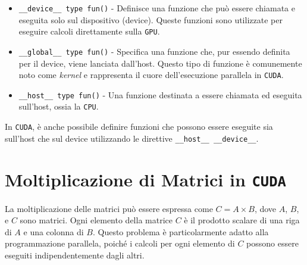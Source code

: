 \begin{itemize}
  \item \texttt{\_\_device\_\_ type fun()} - Definisce una funzione che
  può essere chiamata e eseguita solo sul dispositivo (device). Queste
  funzioni sono utilizzate per eseguire calcoli direttamente sulla \texttt{GPU}.
  \item \texttt{\_\_global\_\_ type fun()} - Specifica una funzione che, pur
  essendo definita per il device, viene lanciata dall'host. Questo tipo di
  funzione è comunemente noto come \textit{kernel} e rappresenta il cuore
  dell'esecuzione parallela in \texttt{CUDA}.
  \item \texttt{\_\_host\_\_ type fun()} - Una funzione destinata a essere
  chiamata ed eseguita sull'host, ossia la \texttt{CPU}.
\end{itemize}
In \texttt{CUDA}, è anche possibile definire funzioni che possono
essere eseguite sia sull'host che sul device utilizzando le direttive
\texttt{\_\_host\_\_ \_\_device\_\_}.

\section{Moltiplicazione di Matrici in \texttt{CUDA}}
La moltiplicazione delle matrici può essere espressa come $C = A \times B$,
dove $A$, $B$, e $C$ sono matrici. Ogni elemento della matrice $C$ è il
prodotto scalare di una riga di $A$ e una colonna di $B$. Questo problema
è particolarmente adatto alla programmazione parallela, poiché i calcoli
per ogni elemento di $C$ possono essere eseguiti indipendentemente dagli
altri.

